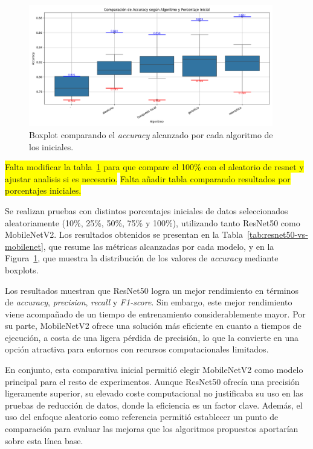 \begin{figure}[htp]
    \centering
    \includegraphics[width=0.95\textwidth]{imagenes/mobilenet-BOXPLOT-generacion-inicial}
    \caption{Boxplot comparando el \textit{accuracy} alcanzado por cada algoritmo de los iniciales.}
    \label{fig:resnet-boxplot-generacion-inicial}
\end{figure}

\colorbox{yellow}{Falta modificar la tabla~\ref{fig:resnet-boxplot-generacion-inicial} para que compare el 100\% con el aleatorio de resnet y ajustar analisis si es necesario.}
\colorbox{yellow}{Falta añadir tabla comparando resultados por porcentajes iniciales.}

Se realizan pruebas con distintos porcentajes iniciales de datos seleccionados aleatoriamente (10\%, 25\%, 50\%, 75\% y 100\%), utilizando tanto ResNet50 como MobileNetV2.
Los resultados obtenidos se presentan en la Tabla~\ref{tab:resnet50-vs-mobilenet}, que resume las métricas alcanzadas por cada modelo, y en la Figura~\ref{fig:resnet-boxplot-generacion-inicial}, que muestra la distribución de los valores de \textit{accuracy} mediante boxplots.

Los resultados muestran que ResNet50 logra un mejor rendimiento en términos de \textit{accuracy}, \textit{precision}, \textit{recall} y \textit{F1-score}.
Sin embargo, este mejor rendimiento viene acompañado de un tiempo de entrenamiento considerablemente mayor.
Por su parte, MobileNetV2 ofrece una solución más eficiente en cuanto a tiempos de ejecución, a costa de una ligera pérdida de precisión, lo que la convierte en una opción atractiva para entornos con recursos computacionales limitados.

En conjunto, esta comparativa inicial permitió elegir MobileNetV2 como modelo principal para el resto de experimentos.
Aunque ResNet50 ofrecía una precisión ligeramente superior, su elevado coste computacional no justificaba su uso en las pruebas de reducción de datos, donde la eficiencia es un factor clave.
Además, el uso del enfoque aleatorio como referencia permitió establecer un punto de comparación para evaluar las mejoras que los algoritmos propuestos aportarían sobre esta línea base.


